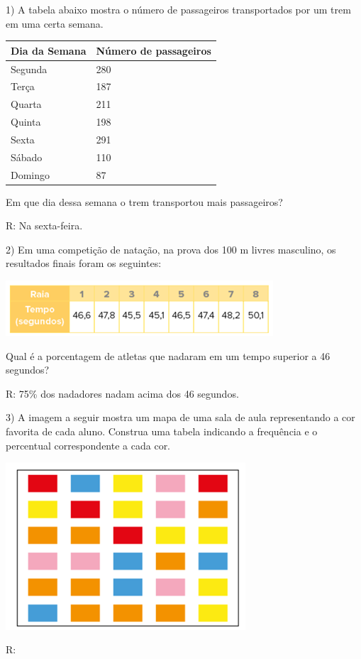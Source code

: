 1) A tabela abaixo mostra o número de passageiros transportados por um
trem em uma certa semana.


\begin{longtable}[]{@{}ll@{}}
\toprule
Dia da Semana & Número de passageiros\tabularnewline
\midrule
\endhead
Segunda & 280\tabularnewline
Terça & 187\tabularnewline
Quarta & 211\tabularnewline
Quinta & 198\tabularnewline
Sexta & 291\tabularnewline
Sábado & 110\tabularnewline
Domingo & 87\tabularnewline
\bottomrule
\end{longtable}

Em que dia dessa semana o trem transportou mais passageiros?

R: Na sexta-feira.

2) Em uma competição de natação, na prova dos 100 m livres masculino, os
resultados finais foram os seguintes:

\includegraphics[width=3.92708in,height=0.8125in]{./imgSAEB_6_MAT/media/image81.png}

Qual é a porcentagem de atletas que nadaram em um tempo superior a 46
segundos?

R: 75\% dos nadadores nadam acima dos 46 segundos.

3) A imagem a seguir mostra um mapa de uma sala de aula representando a
cor favorita de cada aluno. Construa uma tabela indicando a frequência e
o percentual correspondente a cada cor.

\includegraphics[width=3.52292in,height=2.45347in]{./imgSAEB_6_MAT/media/image82.png}

R:

